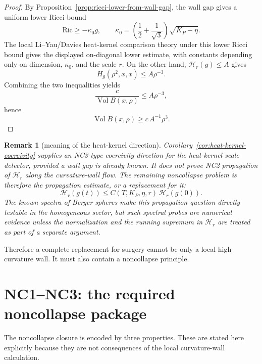 \documentclass[11pt]{amsart}
\newtheorem{remark}{Remark}
\newcommand{\Ric}{\mathrm{Ric}}
\newcommand{\KP}{K_{\!P}}
\newcommand{\Vol}{\operatorname{Vol}}
\begin{document}
\begin{proof}
By Proposition~\ref{prop:ricci-lower-from-wall-gap}, the wall gap gives a
uniform lower Ricci bound
\[
        \Ric\ge-\kappa_0g,
        \qquad
        \kappa_0
        =
        \left(\frac12+\frac1{\sqrt3}\right)\sqrt{\KP-\eta}.
\]
The local Li--Yau/Davies heat-kernel comparison theory under this lower Ricci
bound gives the displayed on-diagonal lower estimate, with constants depending
only on dimension, \(\kappa_0\), and the scale \(r\).  On the other hand,
\(\mathcal H_r(g)\le A\) gives
\[
        H_g(\rho^2,x,x)\le A\rho^{-3}.
\]
Combining the two inequalities yields
\[
        \frac{c}{\Vol B(x,\rho)}
        \le
        A\rho^{-3},
\]
hence
\[
        \Vol B(x,\rho)\ge c\,A^{-1}\rho^3 .
\]
\end{proof}

\begin{remark}[meaning of the heat-kernel direction]\label{rem:heat-kernel-direction}
Corollary~\ref{cor:heat-kernel-coercivity} supplies an NC3-type coercivity
direction for the heat-kernel scale detector, provided a wall gap is already
known.  It does not prove NC2 propagation of \(\mathcal H_r\) along the
curvature-wall flow.  The remaining noncollapse problem is therefore the
propagation estimate, or a replacement for it:
\[
        \mathcal H_r(g(t))
        \le
        C(T,\KP,\eta,r)\,\mathcal H_r(g(0)).
\]
The known spectra of Berger spheres make this propagation question directly
testable in the homogeneous sector, but such spectral probes are numerical
evidence unless the normalization and the running supremum in \(\mathcal H_r\)
are treated as part of a separate argument.
\end{remark}


Therefore a complete replacement for surgery cannot be only a local
high-curvature wall.  It must also contain a noncollapse principle.

\section{NC1--NC3: the required noncollapse package}

The noncollapse closure is encoded by three properties.  These are stated here
explicitly because they are not consequences of the local curvature-wall
calculation.
\end{document}
